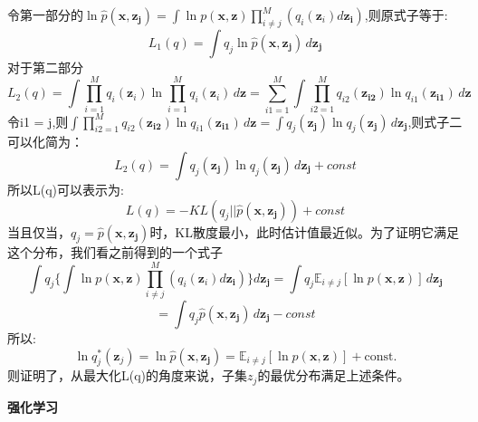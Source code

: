 \documentclass[answers]{exam}  %
\begin{document}
\begin{questions}
\begin{solution}
\begin{parts}
\[            \]
            令第一部分的$\ln \hat{p}(\boldsymbol{x}, \boldsymbol{z_j}) = \int \ln p(\boldsymbol{x}, \boldsymbol{z}) \prod_{i\neq j}^{M}(q_i(\boldsymbol{z}_i)d\boldsymbol{z_i})$,则原式子等于:
            \[
                L_1(q) = \int q_j \ln \hat{p}(\boldsymbol{x}, \boldsymbol{z_j})\, d\boldsymbol{z_j}
            \]
            对于第二部分
            \[
                L_2(q) = \int \prod_{i = 1}^{M}q_i(\boldsymbol{z}_i)\ln \prod_{i =1}^{M}q_i(\boldsymbol{z}_i)\,d\boldsymbol{z} 
                = \sum_{i1 = 1}^{M} \int \prod_{i2 = 1}^{M} q_{i2}(\boldsymbol{z_{i2}}) \ln q_{i1}(\boldsymbol{z_{i1}})  \,d\boldsymbol{z}
            \]
            令i1 = j,则$\int \prod_{i2 = 1}^{M} q_{i2}(\boldsymbol{z_{i2}}) \ln q_{i1}(\boldsymbol{z_{i1}})  \,d\boldsymbol{z} = \int q_j(\boldsymbol{z_j}) \ln q_j(\boldsymbol{z_j})\,d\boldsymbol{z_j}$,则式子二可以化简为：
            \[
                L_2(q) = \int q_j(\boldsymbol{z_j}) \ln q_j(\boldsymbol{z_j})\,d\boldsymbol{z_j} + const
            \]
            所以L(q)可以表示为:
            \[
                L(q) = -KL(q_j || \hat{p}(\boldsymbol{x}, \boldsymbol{z_j})) + const
            \]
            当且仅当，$q_j = \hat{p}(\boldsymbol{x}, \boldsymbol{z_j})$时，KL散度最小，此时估计值最近似。为了证明它满足这个分布，我们看之前得到的一个式子
            \[
                \int q_j \{ \int \ln p(\boldsymbol{x}, \boldsymbol{z}) \prod_{i\neq j}^{M}(q_i(\boldsymbol{z}_i)d\boldsymbol{z_i})\} d\boldsymbol{z_j} = \int q_j  \mathbb{E}_{i \neq j}[\ln p(\mathbf{x}, \mathbf{z})] \,d\boldsymbol{z_j}
            \]
            \[
                = \int q_j \hat{p}(\boldsymbol{x}, \boldsymbol{z_j}) \,d \boldsymbol{z_j} - const
            \]
            所以:
            \[
                \ln q_j^*(\mathbf{z}_j) = \ln  \hat{p}(\boldsymbol{x}, \boldsymbol{z_j})  = \mathbb{E}_{i \neq j}[\ln p(\mathbf{x}, \mathbf{z})] + \text{const}.
            \]
            则证明了，从最大化L(q)的角度来说，子集$z_j$的最优分布满足上述条件。
	\end{parts}
\end{solution}



\question [60] \textbf{强化学习}


\end{questions}
\end{document}

